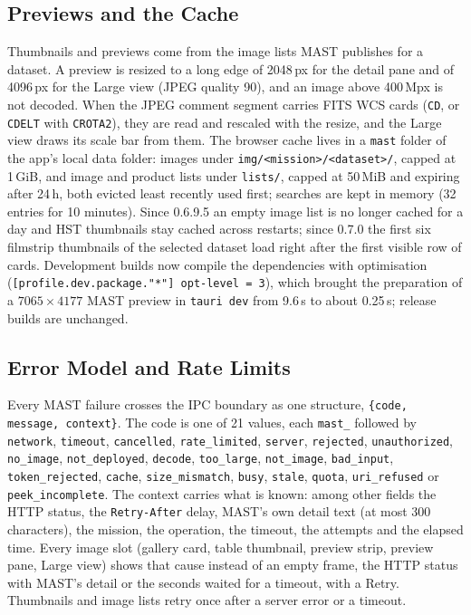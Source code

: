 \documentclass[11pt,a4paper]{article}
\newcommand{\code}[1]{\texttt{\small #1}}
\begin{document}
    \subsection{Previews and the Cache}

    Thumbnails and previews come from the image lists MAST publishes for a dataset. A preview is resized to a long edge of 2048\,px for the detail pane and of 4096\,px for the Large view (JPEG quality 90), and an image above 400\,Mpx is not decoded. When the JPEG comment segment carries FITS WCS cards (\code{CD}, or \code{CDELT} with \code{CROTA2}), they are read and rescaled with the resize, and the Large view draws its scale bar from them. The browser cache lives in a \code{mast} folder of the app's local data folder: images under \code{img/<mission>/<dataset>/}, capped at 1\,GiB, and image and product lists under \code{lists/}, capped at 50\,MiB and expiring after 24\,h, both evicted least recently used first; searches are kept in memory (32 entries for 10 minutes). Since 0.6.9.5 an empty image list is no longer cached for a day and HST thumbnails stay cached across restarts; since 0.7.0 the first six filmstrip thumbnails of the selected dataset load right after the first visible row of cards. Development builds now compile the dependencies with optimisation (\code{[profile.dev.package."*"] opt-level = 3}), which brought the preparation of a $7065 \times 4177$ MAST preview in \code{tauri dev} from 9.6\,s to about 0.25\,s; release builds are unchanged.

    \subsection{Error Model and Rate Limits}

    Every MAST failure crosses the IPC boundary as one structure, \code{\{code, message, context\}}. The code is one of 21 values, each \code{mast\_} followed by \code{network}, \code{timeout}, \code{cancelled}, \code{rate\_limited}, \code{server}, \code{rejected}, \code{unauthorized}, \code{no\_image}, \code{not\_deployed}, \code{decode}, \code{too\_large}, \code{not\_image}, \code{bad\_input}, \code{token\_rejected}, \code{cache}, \code{size\_mismatch}, \code{busy}, \code{stale}, \code{quota}, \code{uri\_refused} or \code{peek\_incomplete}. The context carries what is known: among other fields the HTTP status, the \code{Retry-After} delay, MAST's own detail text (at most 300 characters), the mission, the operation, the timeout, the attempts and the elapsed time. Every image slot (gallery card, table thumbnail, preview strip, preview pane, Large view) shows that cause instead of an empty frame, the HTTP status with MAST's detail or the seconds waited for a timeout, with a Retry. Thumbnails and image lists retry once after a server error or a timeout.
\end{document}
